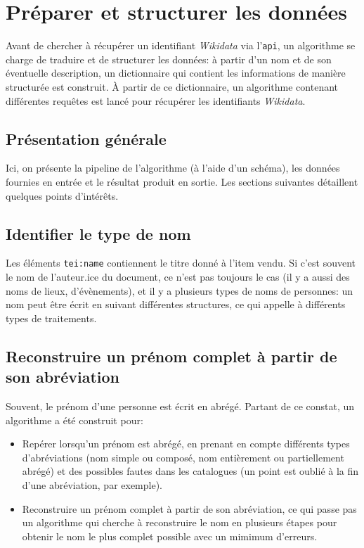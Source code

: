 \documentclass[a4paper, 12pt, twoside]{book}
\newcommand{\api}{\texttt{\gls{api}}}
\newcommand{\wkd}{\textit{Wikidata}}
\begin{document}
\section{Préparer et structurer les données}
Avant de chercher à récupérer un identifiant \wkd{} via l'\api{}, un algorithme se charge de traduire et de structurer les données: à partir d'un nom et de son éventuelle description, un dictionnaire qui contient les informations de manière structurée est construit. À partir de ce dictionnaire, un algorithme contenant différentes requêtes est lancé pour récupérer les identifiants \wkd{}.

\subsection{Présentation générale}
Ici, on présente la pipeline de l'algorithme (à l'aide d'un schéma), les données fournies en entrée et le résultat produit en sortie. Les sections suivantes détaillent quelques points d'intérêts.

\subsection{Identifier le type de nom}
Les éléments \texttt{tei:name} contiennent le titre donné à l'item vendu. Si c'est souvent le nom de l'auteur.ice du document, ce n'est pas toujours le cas (il y a aussi des noms de lieux, d'évènements), et il y a plusieurs types de noms de personnes: un nom peut être écrit en suivant différentes structures, ce qui appelle à différents types de traitements.

\subsection{Reconstruire un prénom complet à partir de son abréviation}
Souvent, le prénom d'une personne est écrit en abrégé. Partant de ce constat, un algorithme a été construit pour:
\begin{itemize}
	\item Repérer lorsqu'un prénom est abrégé, en prenant en compte différents types d'abréviations (nom simple ou composé, nom entièrement ou partiellement abrégé) et des possibles fautes dans les catalogues (un point est oublié à la fin d'une abréviation, par exemple).
	\item Reconstruire un prénom complet à partir de son abréviation, ce qui passe pas un algorithme qui cherche à reconstruire le nom en plusieurs étapes pour obtenir le nom le plus complet possible avec un mimimum d'erreurs.
\end{itemize}
\end{document}
